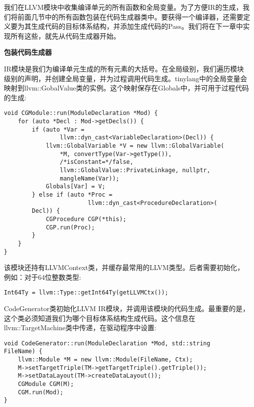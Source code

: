 

我们在LLVM模块中收集编译单元的所有函数和全局变量。为了方便IR的生成，我们将前面几节中的所有函数包装在代码生成器类中。要获得一个编译器，还需要定义要为其生成代码的目标体系结构，并添加生成代码的Pass。我们将在下一章中实现所有这些，就先从代码生成器开始。\par

\hspace*{\fill} \par %
\textbf{包装代码生成器}

IR模块是我们为编译单元生成的所有元素的大括号。在全局级别，我们遍历模块级别的声明，并创建全局变量，并为过程调用代码生成。tinylang中的全局变量会映射到llvm::GobalValue类的实例。这个映射保存在Globals中，并可用于过程代码的生成:\par

\begin{lstlisting}[caption={}]
void CGModule::run(ModuleDeclaration *Mod) {
	for (auto *Decl : Mod->getDecls()) {
		if (auto *Var =
				llvm::dyn_cast<VariableDeclaration>(Decl)) {
			llvm::GlobalVariable *V = new llvm::GlobalVariable(
				*M, convertType(Var->getType()),
				/*isConstant=*/false,
				llvm::GlobalValue::PrivateLinkage, nullptr,
				mangleName(Var));
			Globals[Var] = V;
		} else if (auto *Proc =
						llvm::dyn_cast<ProcedureDeclaration>(
		Decl)) {
			CGProcedure CGP(*this);
			CGP.run(Proc);
		}
	}
}
\end{lstlisting}

该模块还持有LLVMContext类，并缓存最常用的LLVM类型。后者需要初始化，例如：对于64位整数类型:\par

\begin{lstlisting}[caption={}]
Int64Ty = llvm::Type::getInt64Ty(getLLVMCtx());
\end{lstlisting}

CodeGenerator类初始化LLVM IR模块，并调用该模块的代码生成。最重要的是，这个类必须知道我们为哪个目标体系结构生成代码。这个信息在llvm::TargetMachine类中传递，在驱动程序中设置:\par

\begin{lstlisting}[caption={}]
void CodeGenerator::run(ModuleDeclaration *Mod, std::string
FileName) {
	llvm::Module *M = new llvm::Module(FileName, Ctx);
	M->setTargetTriple(TM->getTargetTriple().getTriple());
	M->setDataLayout(TM->createDataLayout());
	CGModule CGM(M);
	CGM.run(Mod);
}
\end{lstlisting}

